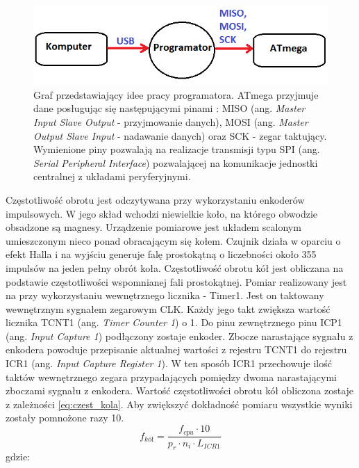   \begin{figure}[H]
    \begin{center}
      \includegraphics[scale=0.7]{imgs/schemat_prog.png}
 	\caption[Podłączenie programatora.]{\small{Graf przedstawiający idee pracy programatora. ATmega przyjmuje dane posługując się następującymi pinami : MISO (ang. \textit{Master Input Slave Output} - przyjmowanie danych), MOSI (ang. \textit{Master Output Slave Input} - nadawanie danych) oraz SCK - zegar taktujący. Wymienione piny pozwalają na realizacje transmisji typu SPI (ang. \textit{Serial Peripheral Interface}) pozwalającej na komunikacje jednostki centralnej z układami peryferyjnymi.}}
	\label{schem_ster}
    \end{center}
  \end{figure}  
  
Częstotliwość obrotu jest odczytywana przy wykorzystaniu enkoderów impulsowych. W jego skład wchodzi niewielkie koło, na którego obwodzie obsadzone są magnesy. Urządzenie pomiarowe jest układem scalonym umieszczonym nieco ponad obracającym się kołem. Czujnik działa w oparciu o efekt Halla i na wyjściu generuje falę prostokątną o liczebności około 355 impulsów na jeden pełny obrót koła. Częstotliwość obrotu kół jest obliczana na podstawie częstotliwości wspomnianej fali prostokątnej. Pomiar realizowany jest na przy wykorzystaniu wewnętrznego licznika - Timer1. Jest on taktowany wewnętrznym sygnałem zegarowym CLK. Każdy jego takt zwiększa wartość licznika TCNT1 (ang. \textit{Timer Counter 1}) o 1. Do pinu zewnętrznego pinu ICP1 (ang. \textit{Input Capture 1}) podłączony zostaje enkoder. Zbocze narastające sygnału z enkodera powoduje przepisanie aktualnej wartości z rejestru TCNT1 do rejestru ICR1 (ang. \textit{Input Capture Register 1}). W ten sposób ICR1 przechowuje ilość taktów wewnętrznego zegara przypadających pomiędzy dwoma narastającymi zboczami sygnału z enkodera. Wartość częstotliwości obrotu kół obliczona zostaje z zależności \ref{eq:czest_kola}. Aby zwiększyć dokładność pomiaru wszystkie wyniki zostały pomnożone razy 10.
\begin{equation}
	f_{kół} =  \frac{f_{cpu} \cdot 10}{p_r \cdot n_i \cdot L_{ICR1} } 
   \label{eq:czest_kola}
 \end{equation}
 gdzie:  
 \begin{equationDescriptor}
 \end{equationDescriptor} 

